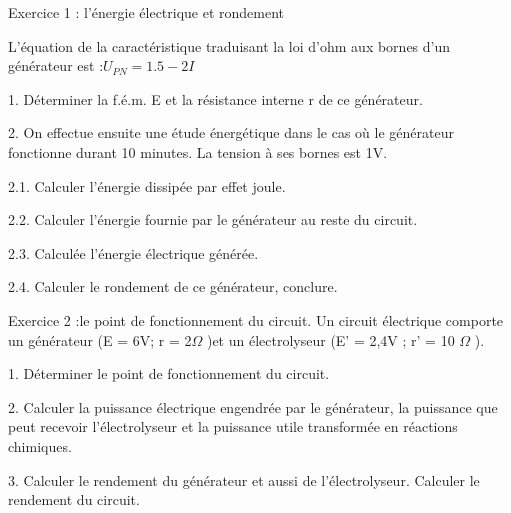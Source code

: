 \documentclass[12pt, french]{article}
\begin{document}
\begin{center}
\end{center}


   \begin{Box2}{Exercice 1 : l’énergie électrique et rondement }

      L’équation de la caractéristique traduisant la loi d’ohm aux bornes d’un générateur est :$ U_{PN} = 1.5 - 2I$

      1. Déterminer la f.é.m. E et la résistance interne r de ce générateur.

      2. On effectue ensuite une étude énergétique dans le cas où le générateur fonctionne durant 10 minutes. La tension à ses bornes est 1V.

      2.1. Calculer l’énergie dissipée par effet joule.

      2.2. Calculer l’énergie fournie par le générateur au reste du circuit.

      2.3. Calculée l’énergie électrique générée.

      2.4. Calculer le rondement de ce générateur, conclure.
   \end{Box2}


\begin{Box2}{Exercice 2 :le point de fonctionnement du circuit. }
Un circuit électrique comporte un générateur (E = 6V; r = 2$\Omega$ )et un électrolyseur
(E' = 2,4V ; r' = 10 $\Omega$ ).

1. Déterminer le point de fonctionnement du circuit.

2. Calculer la puissance électrique engendrée par le générateur, la puissance que peut
recevoir l’électrolyseur et la puissance utile transformée en réactions chimiques.

3. Calculer le rendement du générateur et aussi de l’électrolyseur. Calculer le rendement
du circuit.
\end{Box2}
\end{document}
